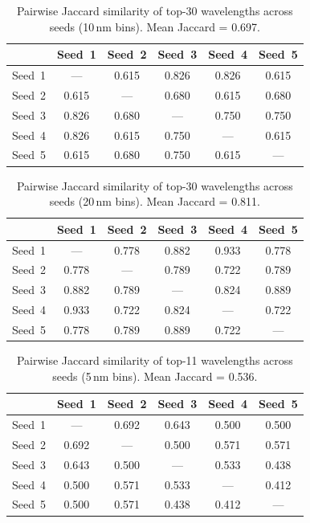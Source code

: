\begin{table}[!htbp]
\centering
\caption[Jaccard similarity: top-30, 10\,nm bins]{Pairwise Jaccard similarity of top-30 wavelengths across seeds (10\,nm bins). Mean Jaccard = 0.697.}
\label{tab:binned_jaccard_30_bin10}
\begin{tabular}{cccccc}
\toprule
 & Seed~1 & Seed~2 & Seed~3 & Seed~4 & Seed~5 \\
\midrule
Seed~1 & ---   & 0.615 & 0.826 & 0.826 & 0.615 \\
Seed~2 & 0.615 & ---   & 0.680 & 0.615 & 0.680 \\
Seed~3 & 0.826 & 0.680 & ---   & 0.750 & 0.750 \\
Seed~4 & 0.826 & 0.615 & 0.750 & ---   & 0.615 \\
Seed~5 & 0.615 & 0.680 & 0.750 & 0.615 & ---   \\
\bottomrule
\end{tabular}
\end{table}

\begin{table}[!htbp]
\centering
\caption[Jaccard similarity: top-30, 20\,nm bins]{Pairwise Jaccard similarity of top-30 wavelengths across seeds (20\,nm bins). Mean Jaccard = 0.811.}
\label{tab:binned_jaccard_30_bin20}
\begin{tabular}{cccccc}
\toprule
 & Seed~1 & Seed~2 & Seed~3 & Seed~4 & Seed~5 \\
\midrule
Seed~1 & ---   & 0.778 & 0.882 & 0.933 & 0.778 \\
Seed~2 & 0.778 & ---   & 0.789 & 0.722 & 0.789 \\
Seed~3 & 0.882 & 0.789 & ---   & 0.824 & 0.889 \\
Seed~4 & 0.933 & 0.722 & 0.824 & ---   & 0.722 \\
Seed~5 & 0.778 & 0.789 & 0.889 & 0.722 & ---   \\
\bottomrule
\end{tabular}
\end{table}

\begin{table}[!htbp]
\centering
\caption[Jaccard similarity: top-11, 5\,nm bins]{Pairwise Jaccard similarity of top-11 wavelengths across seeds (5\,nm bins). Mean Jaccard = 0.536.}
\label{tab:binned_jaccard_11_bin5}
\begin{tabular}{cccccc}
\toprule
 & Seed~1 & Seed~2 & Seed~3 & Seed~4 & Seed~5 \\
\midrule
Seed~1 & ---   & 0.692 & 0.643 & 0.500 & 0.500 \\
Seed~2 & 0.692 & ---   & 0.500 & 0.571 & 0.571 \\
Seed~3 & 0.643 & 0.500 & ---   & 0.533 & 0.438 \\
Seed~4 & 0.500 & 0.571 & 0.533 & ---   & 0.412 \\
Seed~5 & 0.500 & 0.571 & 0.438 & 0.412 & ---   \\
\bottomrule
\end{tabular}
\end{table}

